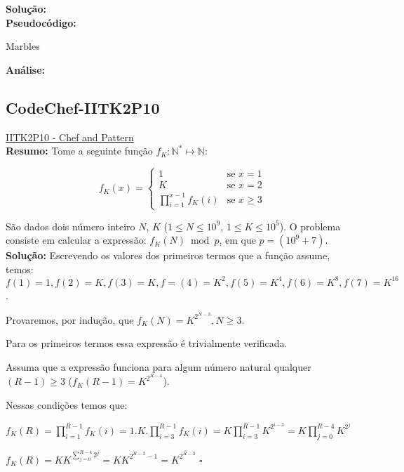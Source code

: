 \textbf{Solução:}
\\

\textbf{Pseudocódigo:}
\begin{algorithm}
\caption{Marbles}
\begin{algorithmic}[1]

\EndProcedure
\end{algorithmic}
\end{algorithm}


\textbf{Análise:}



\subsection{CodeChef-IITK2P10}
\href{https://www.codechef.com/problems/IITK2P10}{IITK2P10 - Chef and Pattern}\\


\textbf{Resumo:}
Tome a seguinte função $f_K:\mathbb{N}^* \longmapsto \mathbb{N}$:

\[
 f_K(x) = 
  \begin{cases} 
   1 & \text{se } x = 1 \\
   K & \text{se } x = 2 \\
   \prod_{i=1}^{x-1}f_K(i) & \text{se } x \geq 3
  \end{cases}
\]

São dados dois número inteiro $N$, $K$ ($1 \leq N \leq 10^9$, $1 \leq K \leq 10^5$). O problema consiste em calcular a expressão: $f_K(N) \bmod p$, em que $p = (10^9+7)$.
\\

\textbf{Solução:}
Escrevendo os valores dos primeiros termos que a função assume, temos: $f(1)=1, f(2)=K, f(3)=K, f=(4)=K^2, f(5)=K^4, f(6)=K^8, f(7)=K^{16}$.

Provaremos, por indução, que $f_K(N) = K^{2^{N-3}}, N \geq 3$.

Para os primeiros termos essa expressão é trivialmente verificada.

Assuma que a expressão funciona para algum número natural qualquer $(R-1) \geq 3$ ($f_K(R-1) = K^{2^{R-4}}$).

Nessas condições temos que: 

$f_K(R) = \prod_{i=1}^{R-1}f_K(i) = 1.K.\prod_{i=3}^{R-1}f_K(i) = K\prod_{i=3}^{R-1}K^{2^{i-3}} = K\prod_{j=0}^{R-4}K^{2^j}$

$f_K(R) = KK^{\sum_{j=0}^{R-4}2^j} = KK^{2^{R-3}-1} = K^{2^{R-3}}$ $\square$

